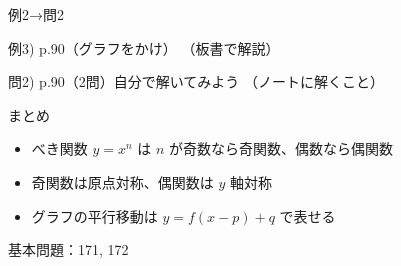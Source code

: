 \documentclass[aspectratio=43,professionalfonts,handout]{beamer}
\begin{document}
\begin{frame}{例2→問2}
  \begin{exampleblock}{例3) p.90（グラフをかけ）}
    （板書で解説）
  \end{exampleblock}

  \vfill

  \begin{block}{問2) p.90（2問）\quad 自分で解いてみよう}
    （ノートに解くこと）
  \end{block}
\end{frame}

\begin{frame}{まとめ}
  \begin{itemize}
    \item べき関数 $y=x^n$ は $n$ が奇数なら奇関数、偶数なら偶関数
    \item 奇関数は原点対称、偶関数は $y$ 軸対称
    \item グラフの平行移動は $y=f(x-p)+q$ で表せる
  \end{itemize}

  \vfill
  {\small 基本問題：171, 172}
\end{frame}
\end{document}
